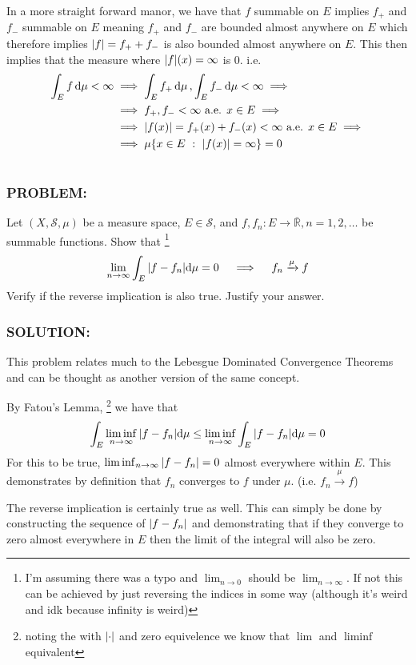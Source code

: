 \documentclass[]{article}
\newcommand{\Problem}{\subsubsection*{\textbf{PROBLEM:}}}
\newcommand{\Solution}{\subsubsection*{\textbf{SOLUTION:}}}
\newcommand{\R}{\mathbb{R}}
\newcommand{\SigAlg}{\mathcal{S}}
\newcommand{\st}{\ : \ }
\begin{document}
In a more straight forward manor, we have that $f$ summable on $E$ implies $f_{+}$ and $f_{-}$ summable on $E$ meaning $f_{+}$ and $f_{-}$ are bounded almost anywhere on $E$ which therefore implies $\abs{f} = f_{+} + f_{-}$ is also bounded almost anywhere on $E$.
This then implies that the measure where $\abs{f}(x) = \infty$ is 0.
i.e.
\begin{align*}
    \int_{E} f \dd{\mu} < \infty 
    &\implies 
    \int_{E} f_{+} \dd{\mu},\int_{E} f_{-} \dd{\mu} < \infty
    \implies\\ &\implies
    f_{+}, f_{-} < \infty \text{ a.e. } x \in E 
    \implies\\ &\implies 
    \abs{f(x)} = f_{+}(x) + f_{-}(x) < \infty \text{ a.e. } x \in E
    \implies \\ &\implies
    \mu\{x \in E \st \abs{f(x)} = \infty\} = 0
\end{align*}


\newpage
\section{}
\Problem
Let $(X, \SigAlg,\mu)$ be a measure space, $E \in \SigAlg$, and $f, f_n : E \to \overline{\R},n = 1, 2, \dots$ be summable functions.
Show that
\footnote{
I'm assuming there was a typo and $\lim_{n \to 0}$ should be $\lim_{n\to\infty}$. 
If not this can be achieved by just reversing the indices in some way (although it's weird and idk because infinity is weird)
}
\[
    \lim_{n \to \infty} \int_{E} \abs{f - f_n} \dd \mu = 0 \quad \implies \quad f_n \xrightarrow{\mu} f
\]
Verify if the reverse implication is also true.
Justify your answer.

\Solution

This problem relates much to the Lebesgue Dominated Convergence Theorems and can be thought as another version of the same concept.

By Fatou's Lemma,
\footnote{noting the with $\abs{\cdot}$ and zero equivelence we know that $\lim$ and $\liminf$ equivalent}
we have that \[
    \int_{E} \liminf_{n \to \infty} \abs{f - f_n} \dd \mu \leq \liminf_{n \to \infty} \int_{E} \abs{f - f_n} \dd \mu = 0
\]
For this to be true, $\liminf_{n \to \infty} \abs{f - f_n} = 0$ almost everywhere within $E$.
This demonstrates by definition that $f_n$ converges to $f$ under $\mu$.
(i.e. $f_n \xrightarrow{\mu} f$)

The reverse implication is certainly true as well.
This can simply be done by constructing the sequence of $\abs{f - f_n}$ and demonstrating that if they converge to zero almost everywhere in $E$ then the limit of the integral will also be zero.
\end{document}
